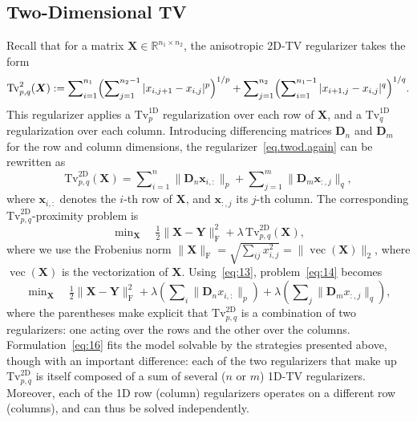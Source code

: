 \documentclass[twoside,11pt]{article}
\newcommand{\vx}{\bm{x}}       \newcommand{\vxh}{\hat{\bm{x}}}        \newcommand{\xh}{\hat{x}}    \newcommand{\vxt}{\tilde{\bm{x}}}       \newcommand{\xt}{\tilde{x}}
\newcommand{\md}{\bm{D}}
\newcommand{\mx}{\bm{X}}
\newcommand{\my}{\bm{Y}}
\newcommand{\mynorm}[2]{\| {#1} \|_{#2}}
\newcommand{\norm}[2]{\mynorm{#1}{#2}}
\newcommand{\enorm}[1]{\mynorm{#1}{2}}
\newcommand{\frob}[1]{\|{#1}\|_{\text{F}}}
\DeclareMathOperator{\vect}{vec}
\newcommand{\nlsum}{\sum\nolimits}
\newcommand{\nlmin}{\min\nolimits}
\newcommand{\reals}{\mathbb{R}}
\newcommand{\half}{\tfrac{1}{2}}
\newcommand{\tvell}{\text{Tv}}
\newcommand{\oned}{\text{1D}}
\newcommand{\twod}{\text{2D}}
\numberwithin{equation}{section}
\numberwithin{theorem}{section}
\begin{document}
\subsection{Two-Dimensional TV}
\label{sec:twod}
Recall that for a matrix $\mx \in \reals^{n_1 \times n_2}$, the anisotropic 2D-TV regularizer takes the form
\begin{equation}
  \label{eq.twod.again}
    \tvell_{p,q}^{2}(\mx) :=
    \nlsum_{i=1}^{n_1}\Bigl(\nlsum_{j=1}^{n_2-1}|x_{i,j+1}-x_{i,j}|^p\Bigr)^{1/p}
    + \nlsum_{j=1}^{n_2}\Bigl(\nlsum_{i=1}^{n_1-1}|x_{i+1,j}-x_{i,j}|^q\Bigr)^{1/q}.
\end{equation}
This regularizer applies a $\tvell_p^{\oned}$ regularization over each row of $\mx$, and a $\tvell_q^{\oned}$ regularization over each column. Introducing differencing matrices $\md_n$ and $\md_m$ for the row and column dimensions, the regularizer~\eqref{eq.twod.again} can be rewritten as
\begin{equation}
  \label{eq:13}
  \tvell_{p,q}^{\twod}(\mx) = \nlsum_{i=1}^n \norm{\md_n \vx_{i,:}}{p} + \nlsum_{j=1}^m \norm{\md_m \vx_{:,j}}{q},
\end{equation}
where $\vx_{i,:}$ denotes the $i$-th row of $\mx$, and $\vx_{:,j}$ its $j$-th column.  The corresponding $\tvell_{p,q}^{\twod}$-proximity problem is
\begin{equation}
  \label{eq:14}
  \nlmin_{\mx}\quad \half\frob{\mx-\my}^2 + \lambda\,\tvell^{\twod}_{p,q}(\mx),
\end{equation}
where we use the Frobenius norm $\frob{\mx} = \sqrt{\sum_{ij}x_{i,j}^2} = \enorm{\vect(\mx)}$,  where $\vect(\mx)$ is the vectorization of $\mx$. Using~\eqref{eq:13}, problem~\eqref{eq:14} becomes
\begin{equation}
  \label{eq:16}
  \nlmin_{\mx}\quad \half\frob{\mx-\my}^2 + \lambda \left( \nlsum_i \norm{\md_n x_{i,:}}{p} \right) + \lambda \left( \nlsum_j \norm{\md_m x_{:,j}}{q} \right),
\end{equation}
where the parentheses make explicit that $\tvell^{\twod}_{p,q}$ is a combination of two regularizers: one acting over the rows and the other over the columns. Formulation~\eqref{eq:16} fits the model solvable by the strategies presented above, though with an important difference: each of the two regularizers that make up $\tvell^{\twod}_{p,q}$ is itself composed of a sum of several ($n$ or $m$) 1D-TV regularizers. Moreover, each of the 1D row (column) regularizers operates on a different row (columns), and can thus be solved independently.
\end{document}
